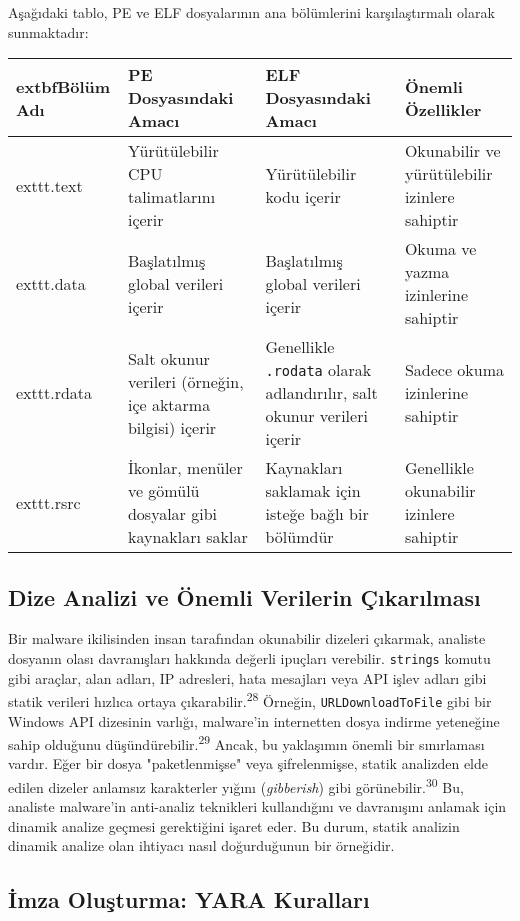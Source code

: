 Aşağıdaki tablo, PE ve ELF dosyalarının ana bölümlerini karşılaştırmalı olarak sunmaktadır:

\begin{longtable}{|l|p{3.5cm}|p{3.5cm}|p{3.5cm}|}
\hline
	extbf{Bölüm Adı} & \textbf{PE Dosyasındaki Amacı} & \textbf{ELF Dosyasındaki Amacı} & \textbf{Önemli Özellikler} \\
\hline
	exttt{.text} & Yürütülebilir CPU talimatlarını içerir & Yürütülebilir kodu içerir & Okunabilir ve yürütülebilir izinlere sahiptir \\
\hline
	exttt{.data} & Başlatılmış global verileri içerir & Başlatılmış global verileri içerir & Okuma ve yazma izinlerine sahiptir \\
\hline
	exttt{.rdata} & Salt okunur verileri (örneğin, içe aktarma bilgisi) içerir & Genellikle \texttt{.rodata} olarak adlandırılır, salt okunur verileri içerir & Sadece okuma izinlerine sahiptir \\
\hline
	exttt{.rsrc} & İkonlar, menüler ve gömülü dosyalar gibi kaynakları saklar & Kaynakları saklamak için isteğe bağlı bir bölümdür & Genellikle okunabilir izinlere sahiptir \\
\hline
\end{longtable}

\subsection{Dize Analizi ve Önemli Verilerin Çıkarılması}

Bir malware ikilisinden insan tarafından okunabilir dizeleri çıkarmak, analiste dosyanın olası davranışları hakkında değerli ipuçları verebilir. \texttt{strings} komutu gibi araçlar, alan adları, IP adresleri, hata mesajları veya API işlev adları gibi statik verileri hızlıca ortaya çıkarabilir.\textsuperscript{28} Örneğin, \texttt{URLDownloadToFile} gibi bir Windows API dizesinin varlığı, malware'in internetten dosya indirme yeteneğine sahip olduğunu düşündürebilir.\textsuperscript{29} Ancak, bu yaklaşımın önemli bir sınırlaması vardır. Eğer bir dosya "paketlenmişse" veya şifrelenmişse, statik analizden elde edilen dizeler anlamsız karakterler yığını (\textit{gibberish}) gibi görünebilir.\textsuperscript{30} Bu, analiste malware'in anti-analiz teknikleri kullandığını ve davranışını anlamak için dinamik analize geçmesi gerektiğini işaret eder. Bu durum, statik analizin dinamik analize olan ihtiyacı nasıl doğurduğunun bir örneğidir.

\subsection{İmza Oluşturma: YARA Kuralları}

